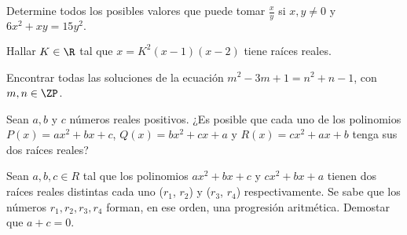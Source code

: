\begin{section-problem}
    Determine todos los posibles valores que puede tomar $\frac{x}{y}$ si $x, y \neq 0$ y $6x^2 + xy = 15y^2.$
\end{section-problem}

\begin{section-problem}
    Hallar $K \in \R$ tal que $x = K^2(x - 1)(x - 2)$ tiene raíces reales.
\end{section-problem}

\begin{section-problem}
    Encontrar todas las soluciones de la ecuación $m^2 - 3m + 1 = n^2 + n - 1$, con $m, n \in \ZP$.
\end{section-problem}

\begin{section-problem}
    Sean $a, b$ y $c$ números reales positivos.
    ¿Es posible que cada uno de los polinomios $P(x) = ax^2 + bx + c$, $Q(x) = bx^2 + cx + a$ y $R(x) = cx^2 + ax + b$ tenga sus dos raíces reales?
\end{section-problem}

\begin{section-problem}
    Sean $a, b, c \in R$ tal que los polinomios $ax^2 + bx + c$ y $cx^2 + bx + a$
    tienen dos raíces reales distintas cada uno ($r_1$, $r_2$) y ($r_3$, $r_4$) respectivamente.
    Se sabe que los números $r_1, r_2, r_3, r_4$ forman, en ese orden, una progresión aritmética.
    Demostar que $a + c = 0.$
\end{section-problem}
